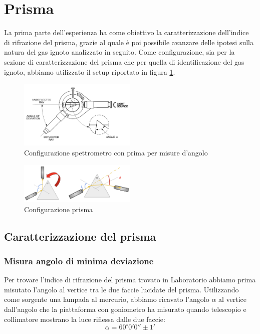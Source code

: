 \documentclass[letterpaper,12pt]{article}
\begin{document}
\section{Prisma}
La prima parte dell'esperienza ha come obiettivo la caratterizzazione dell'indice di rifrazione del prisma, 
grazie al quale è poi possibile avanzare delle ipotesi sulla natura del gas ignoto analizzato in seguito. Come configurazione, sia per
la sezione di caratterizzazione del prisma che per quella di identificazione del gas ignoto, abbiamo utilizzato il setup
riportato in figura \ref{fig:SetupPrisma}.
\begin{figure}[h!]
	\centering
	\includegraphics[width = 0.5\textwidth]{SetupIniziale.jpeg}
	\caption{Configurazione spettrometro con prima per misure d'angolo}
	\label{fig:SetupPrisma}
\end{figure}

\begin{figure}[h!]
	\centering
	\includegraphics[width = 0.5\textwidth]{Prisma.jpeg}
	\caption{Configurazione prisma}
	\label{fig:Prisma}
\end{figure}


\subsection{Caratterizzazione del prisma}


\subsubsection{Misura angolo di minima deviazione}
Per trovare l'indice di rifrazione del prisma trovato in Laboratorio
abbiamo prima misutato l'angolo al vertice tra le due faccie lucidate
del prisma. Utilizzando come sorgente una lampada al mercurio, abbiamo 
ricavato l'angolo $\alpha$ al vertice dall'angolo che la piattaforma con goniometro
ha misurato quando telescopio e collimatore mostrano la luce riflessa dalle due faccie:
$$\alpha = 60^{\circ} 0' 0'' \pm 1'$$
\end{document}
